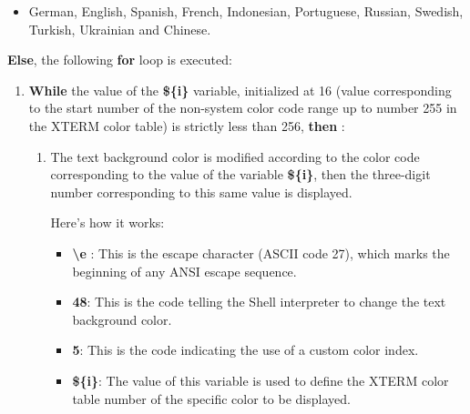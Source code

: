 \documentclass[a4paper,10pt]{article}
\begin{document}
    \begin{justify}
        \begin{itemize}
            \item German, English, Spanish, French, Indonesian, Portuguese, Russian, Swedish, Turkish, Ukrainian and Chinese.
        \end{itemize}
    \end{justify}

    \begin{justify}
    	\textbf{\color{cond}Else}, the following \textbf{\color{loop}for} loop is executed:

    	\begin{enumerate}
    	    \item \textbf{\color{loop}While} the value of the \textbf{\color{vars}\$\{i\}} variable, initialized at 16 (value corresponding to the start number of the non-system color code range up to number 255 in the XTERM color table) is strictly less than 256, \textbf{\color{loop}then} :

            \begin{enumerate}
                \item The text background color is modified according to the color code corresponding to the value of the variable \textbf{\color{vars}\$\{i\}}, then the three-digit number corresponding to this same value is displayed.

                \setlength{\parskip}{1em}

                Here's how it works:

                \begin{itemize}
                    \setlength{\parskip}{1em}

                    \item \textbf{\textbackslash{e}} : This is the escape character (ASCII code 27), which marks the beginning of any ANSI escape sequence.
                    \item \textbf{48}: This is the code telling the Shell interpreter to change the text background color.

                    \item \textbf{5}: This is the code indicating the use of a custom color index.

                    \item \textbf{\color{vars}\$\{i\}}: The value of this variable is used to define the XTERM color table number of the specific color to be displayed.


\end{itemize}
\end{enumerate}
\end{enumerate}
\end{justify}
\end{document}
